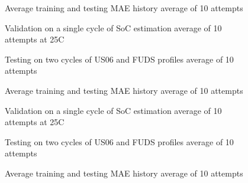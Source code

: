 \begin{figure*}[htbp]
    \centering
    \begin{subfigure}[b]{0.325\textwidth}
        \centering
        
        \caption{Average training and testing MAE history average of 10 attempts}
    \end{subfigure}
    \hfill
    \begin{subfigure}[b]{0.325\textwidth}
        \centering
        
        \caption{Validation on a single cycle of SoC estimation average of 10 attempts at 25\textdegree{}C}
    \end{subfigure}
    \hfill
    \begin{subfigure}[b]{0.325\textwidth}
        \centering
        
        \caption{Testing on two cycles of US06 and FUDS profiles average of 10 attempts}
        \label{subfig:Model-1res-DSTvsFUDS}
    \end{subfigure}
    \begin{subfigure}[b]{0.325\textwidth}
        \centering
        
        \caption{Average training and testing MAE history average of 10 attempts}
    \end{subfigure}
    \hfill
    \begin{subfigure}[b]{0.325\textwidth}
        \centering
        
        \caption{Validation on a single cycle of SoC estimation average of 10 attempts at 25\textdegree{}C}
    \end{subfigure}
    \hfill
    \begin{subfigure}[b]{0.325\textwidth}
        \centering
        
        \caption{Testing on two cycles of US06 and FUDS profiles average of 10 attempts}
    \end{subfigure}
    \begin{subfigure}[b]{0.325\textwidth}
        \centering
        
        \caption{Average training and testing MAE history average of 10 attempts}
    \end{subfigure}

\end{figure*}
